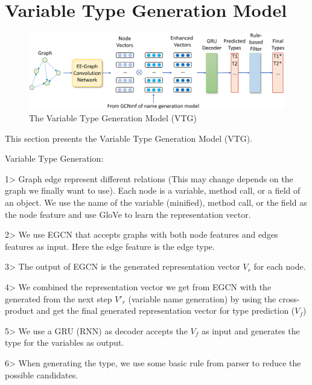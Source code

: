 \section{Variable Type Generation Model}
\label{sec:type-gen}

\begin{figure}[ht]
	\begin{center}
	  \includegraphics[width=5in]{figures/type-gen-model}
          \vspace{-6pt}
		\caption{The Variable Type Generation Model (VTG)}
		\label{fig:type-gen}
	\end{center}
\end{figure}

This section presents the Variable Type Generation Model (VTG).

Variable Type Generation:

1> Graph edge represent different relations (This may change depends on the graph we finally want to use). Each node is a variable, method call, or a field of an object. We use the name of the variable (minified), method call, or the field as the node feature and use GloVe to learn the representation vector.

2> We use EGCN that accepts graphs with both node features and edges features as input. Here the edge feature is the edge type. 

3> The output of EGCN is the generated representation vector $V_r$ for each node. 

4> We combined the representation vector we get from EGCN with the generated from the next step $V'_r$ (variable name generation) by using the cross-product and get the final generated representation vector for type prediction ($V_f$)

5> We use a GRU (RNN) as decoder accepts the $V_f$ as input and generates the type for the variables as output.

6> When generating the type, we use some basic rule from parser to reduce the possible candidates.
